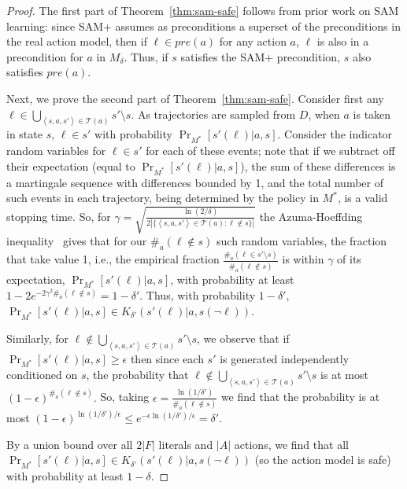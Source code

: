 \documentclass[letterpaper]{article} %
\newcommand{\pre}{\textit{pre}}
\newcommand{\tuple}[1]{\ensuremath{\left \langle #1 \right \rangle }}
\begin{document}
\begin{proof}
The first part of Theorem~\ref{thm:sam-safe} follows from prior work on SAM learning: since SAM+ assumes as preconditions a superset of the preconditions in the real action model, then if $\ell\in\pre(a)$ for any action $a$, $\ell$ is also in a precondition for $a$ in $M_\delta$. %
Thus, if $s$ satisfies the SAM+ precondition, $s$ also satisfies $\pre(a)$.

Next, we prove the second part of Theorem~\ref{thm:sam-safe}. 
Consider first any $\ell\in\bigcup_{\tuple{s, a, s'}\in \mathcal{T}(a)} s'\setminus s $. 
As trajectories are sampled from $D$, when $a$ is taken in state $s$, $\ell\in s'$ with probability $\Pr_{M^*}[s'(\ell)|a,s]$. 
Consider the indicator random variables for $\ell\in s'$ for each of these events; note that if we subtract off their expectation (equal to $\Pr_{M^*}[s'(\ell)|a,s]$), the sum of these differences is a martingale sequence with differences bounded by 1, and the total number of such events in each trajectory, being determined by the policy in $M^*$, is a valid stopping time. 
So, for 
$
\gamma = \sqrt{\frac{\ln(2/\delta)}{2|\{\tuple{s, a, s'}\in \mathcal{T}(a):\ell\notin s\}|}}
$
the Azuma-Hoeffding inequality~\cite{azuma1967,hoeffding1963probability} gives that for our 
$\#_a(\ell\notin s)$ 
such random variables, the fraction that take value 1, i.e., the empirical fraction
$
\frac{\#_a(\ell\in s'\setminus s)}{\#_a(\ell \notin s)}
$
is within $\gamma$ of its expectation, $\Pr_{M^*}[s'(\ell)|a,s]$, with probability at least %
$1-2e^{-2\gamma^2\#_a(\ell \notin s)}=1-\delta'$. 
Thus, with probability $1-\delta'$, $\Pr_{M^*}[s'(\ell)|a,s]\in K_{\delta'}(s'(\ell)|a,s(\neg\ell))$. 

Similarly, for $\ell\notin\bigcup_{\tuple{s, a, s'}\in \mathcal{T}(a)} s'\setminus s$, we observe that if 
$\Pr_{M^*}[s'(\ell)|a,s]\geq \epsilon$
then since each $s'$ is generated independently conditioned on $s$, the probability that $\ell\notin\bigcup_{\tuple{s, a, s'}\in \mathcal{T}(a)} s'\setminus s$ is at most
$
(1-\epsilon)^{\#_a(\ell\notin s)}.
$
So, taking
$
\epsilon = \frac{\ln(1/\delta')}{\#_a(\ell\notin s)}
$
we find that the probability is at most
$
(1-\epsilon)^{\ln(1/\delta')/\epsilon}
\leq e^{-\epsilon \ln(1/\delta')/\epsilon}
=\delta'.
$

By a union bound over all $2|F|$ literals and $|A|$ actions, we find that all $\Pr_{M^*}[s'(\ell)|a,s]\in K_{\delta'}(s'(\ell)|a,s(\neg\ell))$ (so the action model is safe) with probability at least $1-\delta$. %
\end{proof}
\end{document}
